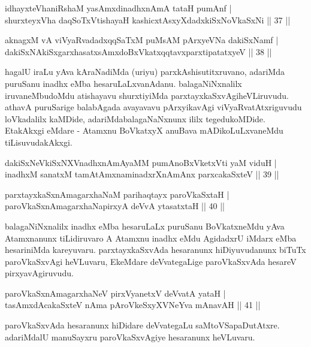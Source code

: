 \begin{shl}
idhayxteV\s haniRshaM yasAmxdinadhxnAmA tataH pumAnf |\\
shurxteyxVha daqSoTxV\s tishayaH kashicxtAsxyXdadxkiSxNoV\s kaSxNi \hfill || 37 || 
\end{shl}

\begin{shl}
aknagxM vA viVyaRvadadxqqSaTxM puMsAM pArxyeVNa dakiSxNamf |\\
dakiSxNAkiSxgarxhasatxsAmxdoBxVkatxqqtavxparxtipatatxyeV \hfill || 38 || 
\end{shl}

\begin{artha}
hagalU iraLu yAva kAraNadiMda (uriyu) parxkAshisutitxru\-vano, adariMda puruSanu inadhx eMba hesaruLaLxvanAdanu. balagaNiNxnalilx iruvaneMbudoMdu atishayavu shurxtiyiMda parxtayxkaSxvAgi\break heVLiruvudu. athavA puruSarige balabAgada avayavavu pArxyikavAgi viVyaRvatAtxriguvudu loVkadalilx kaMDide, adariMda\break balagaNaNxnunx ililx tegedukoMDide. EtakAkxgi eMdare - Atamxnu BoVkatxyX anuBava mADikoLuLxvaneMdu tiLisuvudakAkxgi.
\end{artha}

\begin{shl}
dakiSxNeV\s kiSxNXVnadhxnAmA\s yaMM pumAnoBxVketxVti yaM viduH |\\
inadhxM sanatxM tamAtAmxnaminadxrXnAmAnx parxcakaSxteV \hfill || 39 || 
\end{shl}

\begin{shl}
parxtayxkaSxnAmagarxhaNaM parihaqtayx paroVkaSxtaH |\\
paroVkaSxnAmagarxhaNapirxyA deVvA ytasatxtaH \hfill || 40 || 
\end{shl}

\begin{artha}
balagaNiNxnalilx inadhx eMba hesaruLaLx puruSanu BoVkatxneMdu yAva Atamxnanunx tiLidiruvaro A Atamxnu inadhx eMdu AgidadxrU iMdarx eMba hesariniMda kareyuvaru. parxtayxkaSxvAda hesaranunx hiDiyuvudanunx biTuTx paroVkaSxvAgi heVLuvaru, EkeMdare deVvategaLige paroVkaSxvAda hesareV pirxyavAgiruvudu.
\end{artha}

\begin{shl}
paroVkaSxnAmagarxhaNeV pirxVyanetxV deVvatA yataH |\\
tasAmxdAcakaSxteV nAma pAroVkeSxyXVNeYva mAnavAH \hfill || 41 || 
\end{shl}

\begin{artha}
paroVkaSxvAda hesaranunx hiDidare deVvategaLu saMtoVSa\break paDutAtxre. adariMdalU manuSayxru paroVkaSxvAgiye hesaranunx heVLuvaru.
\end{artha}

